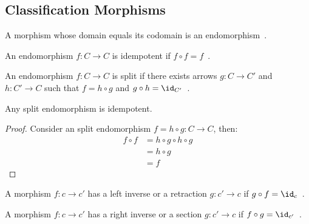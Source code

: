 \subsection{Classification Morphisms}

\begin{definition}
  A morphism whose domain equals its codomain is an
  endomorphism~\parencite[p.~7]{riehl:category_theory_in_context}.
\end{definition}

\begin{definition}
  An endomorphism $f:C\to C$ is idempotent if $f\circ f =
  f$~\parencite[p.~20]{lane:working_mathematician}.
\end{definition}

\begin{definition}
  An endomorphism $f:C\to C$ is split if there exists arrows $g:C\to C'$ and
  $h:C'\to C$ such that $f=h\circ g$ and $g\circ h=
  \id_{C'}$~\parencite[p.~20]{lane:working_mathematician}.
\end{definition}

\begin{theorem}
  Any split endomorphism is idempotent.

  \begin{proof}
    Consider an split endomorphism $f=h\circ g:C\to C$, then:
    \[
      \begin{aligned}
        f\circ f &= h\circ g \circ h\circ g\\
        &= h\circ g\\
        &= f
      \end{aligned}
    \]
  \end{proof}
  \vspace{-\baselineskip}
\end{theorem}

\begin{definition}
  A morphism $f: c\to c'$ has a left inverse or a retraction $g: c'\to c$ if
  $g\circ f = \id_c$~\parencite[p.~19]{lane:working_mathematician}.
\end{definition}

\begin{definition}
  A morphism $f: c\to c'$ has a right inverse or a section $g: c'\to c$ if
  $f\circ g = \id_{c'}$~\parencite[p.~19]{lane:working_mathematician}.
\end{definition}

